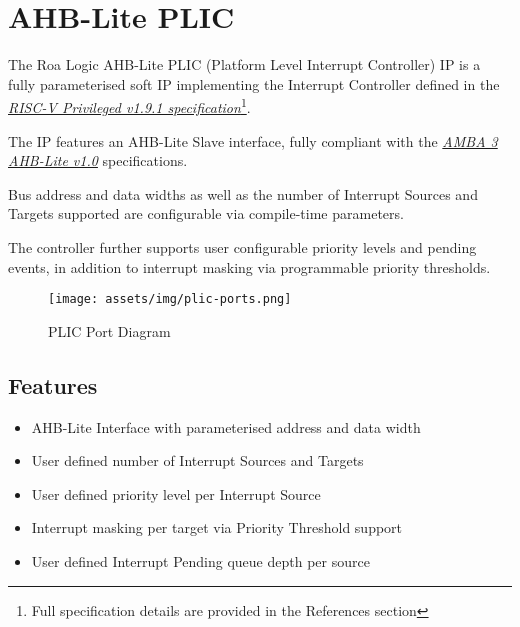 \chapter{AHB-Lite PLIC}

The Roa Logic AHB-Lite PLIC (Platform Level Interrupt Controller) IP is a fully parameterised soft IP implementing the Interrupt Controller defined in the \emph{\href{https://github.com/riscv/riscv-isa-manual/blob/master/release/riscv-privileged-v1.9.1.pdf}{RISC-V Privileged v1.9.1 specification}}\footnote{Full specification details are provided in the References section}.

The IP features an AHB-Lite Slave interface, fully compliant with the \emph{\href{https://www.arm.com/products/system-ip/amba-specifications}{AMBA 3 AHB-Lite v1.0}} specifications. 

Bus address and data widths as well as the number of Interrupt Sources and Targets supported are configurable via compile-time parameters.

The controller further supports user configurable priority levels and pending events, in addition to interrupt masking via programmable priority thresholds.

\begin{figure}[!htb]
  \texttt{[image: assets/img/plic-ports.png]}
  \caption{PLIC Port Diagram}
  \label{fig:PORTDIAG}
\end{figure}

\section{Features}

\begin{itemize}
\item
AHB-Lite Interface with parameterised address and data width
\item
User defined number of Interrupt Sources and Targets
\item
User defined priority level per Interrupt Source
\item
Interrupt masking per target via Priority Threshold support
\item
User defined Interrupt Pending queue depth per source
\end{itemize}
